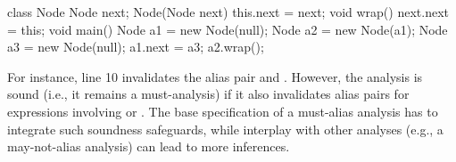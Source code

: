 
\vspace{-0.5cm}
\begin{minipage}[l]{3in}
\begin{javacode}
class Node {
	Node next;
	Node(Node next) { this.next = next;	}
	void wrap() { next.next = this;	}
}
void main() {
	Node a1 = new Node(null);
	Node a2 = new Node(a1);
	Node a3 = new Node(null);
	a1.next = a3;
	a2.wrap();
}
\end{javacode}
\end{minipage}

For instance,
line 10 invalidates the alias pair  and . However, the analysis
is sound (i.e., it remains a must-analysis) if it also invalidates
alias pairs for expressions involving  or . The base
specification of a must-alias analysis has to integrate such soundness safeguards,
while interplay with other analyses (e.g., a may-not-alias analysis) can lead
to more inferences.




